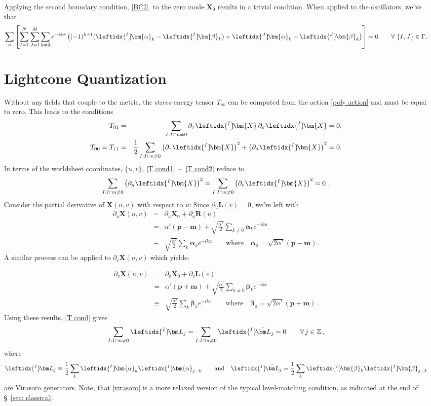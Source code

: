 \documentclass{article}
\newcommand{\be}{\begin{eqnarray}}
\newcommand{\ee}{\end{eqnarray}}
\def\X{\bm{X}}
\def\L{\bm{\lambda}}
\def\a{\bm{a}}
\def\b{\bm{b}}
\def\lI{\leftidx{^I} \! }
\def\lJ{\leftidx{^J} \! }
\def\L{\bm{L}}
\def\R{\bm{R}}
\def\a{\bm{\alpha}}
\def\b{\bm{\beta}}
\begin{document}
Applying the second boundary condition, \eqref{BC2}, to the zero mode $\X_0$ results in a trivial condition. When applied to the oscillators, we've that
\be
\sum_n \left[ \sum_{I=1}^N \sum_{J=1}^M \sum_{k \neq 0} e^{-ik\tau} \left( (-1)^{k+1} (\lI \a_k - \lI \b_k) + \lJ \a_k - \lJ \b_k \right) \right] = 0 \qquad \forall \ \{I,J\} \in \Gamma.
\ee



\section{\textbf{Lightcone Quantization}}

Without any fields that couple to the metric, the stress-energy tensor $T_{ab}$ can be computed from the action \eqref{poly action} and must be equal to zero. This leads to the conditions
\be
\label{T cond1}
T_{01} &=& \sum_{I: I \cap n \neq 0} \partial_\tau \lI \X \,  \partial_\sigma \lI \X = 0 , \\
\label{T cond2}
T_{00} = T_{11} &=& \frac{1}{2} \sum_{I: I \cap n \neq 0} \left( \partial_\tau \lI\X\right)^2 + \left(\partial_\sigma \lI\X \right)^2 = 0.
\ee
In terms of the worldsheet coordinates, $\{u, v\}$, \eqref{T cond1}~\!--~\!\eqref{T cond2} reduce to 
\be
\label{T cond}
\sum_{I: I \cap n \neq 0} \left( \partial_u \lI \X \right)^2 = \sum_{I: I \cap n \neq 0} \left( \partial_v \lI \X \right)^2 = 0\ .
\ee
Consider the partial derivative of $\X(u,v)$ with respect to $u$: Since $\partial_u \L(v) = 0$, we're left with
\be
\partial_u \X(u,v) &=& \partial_u \X_0 + \partial_u \R(u) \nonumber \\
			  &=& \alpha' ({\bm p} - {\bm m} ) + \sqrt{\frac{\alpha'}{2}}\sum_{k \neq 0} \a_k e^{-ik u} \nonumber \\
			  &\equiv& \sqrt{\frac{\alpha'}{2}} \sum_k \a_k e^{-iku} \qquad \text{where} \quad \a_0 = \sqrt{2\alpha'} ({\bm p} - {\bm m}) \, .
\ee
A similar process can be applied to $\partial_v \X (u,v)$ which yields:

\be
\partial_v \X(u,v) &=& \partial_v \X_0 + \partial_v \L(v) \nonumber \\
			  &=& \alpha' ( {\bm p} + {\bm m}) + \sqrt{\frac{\alpha'}{2}} \sum_{k \neq 0} \b_k e^{-ik v} \nonumber \\
			  & \equiv & \sqrt{\frac{\alpha'}{2}} \sum_k \b_k e^{-ikv} \qquad \text{where} \quad \b_0 = \sqrt{2\alpha'} ({\bm p} + {\bm m}) \, .
\ee
Using these results, \eqref{T cond} gives
\be 
\label{virasoro}
\sum_{I: I \cap n \neq 0} \lI {\bm L}_j = \sum_{I: I \cap n \neq 0} \lI \tilde{{\bm L}}_j = 0 \qquad \forall \, j \in \mathbb{Z} \, ,
\ee
where 
\be
\lI {\bm L}_j \equiv \frac{1}{2} \sum_k \lI \a_k \lI \a_{j-k} \qquad \text{and} \quad \lI \tilde{{\bm L}}_j = \frac{1}{2} \sum_k \lI \b_k \lI \b_{j-k}
\ee
are Virasoro generators. Note, that \eqref{virasoro} is a more relaxed version of the typical level-matching condition, as indicated at the end of \S~\!\ref{sec: classical}.
\end{document}
